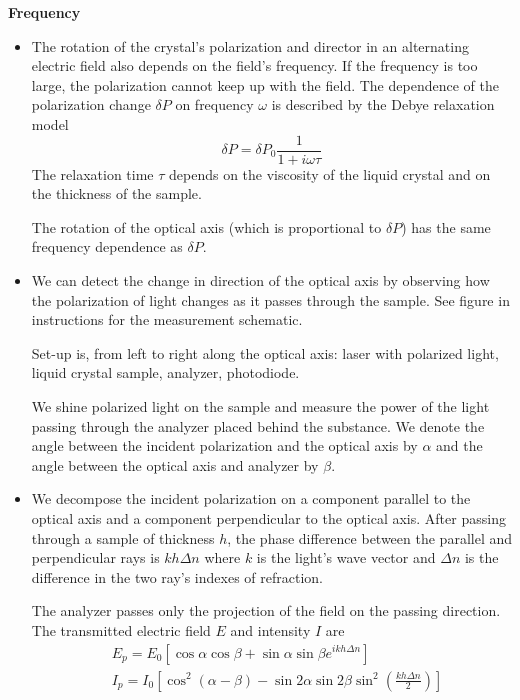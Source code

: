 \documentclass[11pt, a4paper]{article}
\begin{document}
\textbf{Frequency}
\begin{itemize}
	\item The rotation of the crystal's polarization and director in an alternating electric field also depends on the field's frequency. If the frequency is too large, the polarization cannot keep up with the field. The dependence of the polarization change $ \delta P $ on frequency $ \omega $ is described by the Debye relaxation model
	\begin{equation}
		\delta P = \delta P_{0} \frac{1}{1 + i\omega \tau} \label{eleopt:eq:debye_relaxation}
	\end{equation}
	The relaxation time $ \tau $ depends on the viscosity of the liquid crystal and on the thickness of the sample. 
	
	The rotation of the optical axis (which is proportional to $ \delta P $) has the same frequency dependence as $ \delta P $.
	
	\item We can detect the change in direction of the optical axis by observing how the polarization of light changes as it passes through the sample. See figure in instructions for the measurement schematic.  
	
	Set-up is, from left to right along the optical axis: laser with polarized light, liquid crystal sample, analyzer, photodiode.
	
	We shine polarized light on the sample and measure the power of the light passing through the analyzer placed behind the substance. We denote the angle between the incident polarization and the optical axis by $ \alpha $ and the angle between the optical axis and analyzer by $ \beta $. 
	
	\item We decompose the incident polarization on a component parallel to the optical axis and a component perpendicular to the optical axis. After passing through a sample of thickness $ h $, the phase difference between the parallel and perpendicular rays is $ kh \Delta n $ where $ k $ is the light's wave vector and $ \Delta n $ is the difference in the two ray's indexes of refraction.
	
	
	The analyzer passes only the projection of the field on the passing direction. The transmitted electric field $ E $ and intensity $ I $ are
	\begin{align*}
		&E_{p} = E_{0}\left [\cos \alpha \cos \beta + \sin \alpha \sin \beta e^{ikh\Delta n}\right]\\
		&I_{p} = I_{0}\left [\cos^{2}(\alpha-\beta) - \sin 2\alpha \sin 2\beta \sin^{2}\left(\frac{kh\Delta n}{2}\right)\right]
	\end{align*}
	

\end{itemize}
\end{document}
